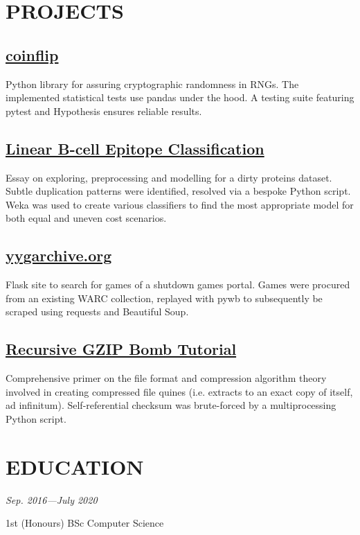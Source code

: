 \documentclass[11pt]{article}
\newcommand{\fakesubsection}[1]{\large{\subsectionfont{#1}}}
\begin{document}
\section*{PROJECTS}

\subsection*{\href{https://github.com/honno/coinflip/}{coinflip}}

Python library for assuring cryptographic randomness in RNGs. The implemented statistical tests use pandas under the hood. A testing suite featuring pytest and Hypothesis ensures reliable results.

\subsection*{\href{https://github.com/honno/epitope-classification}{Linear B-cell Epitope Classification}}

Essay on exploring, preprocessing and modelling for a dirty proteins dataset. Subtle duplication patterns  were identified, resolved via a bespoke Python script. Weka was used to create various classifiers to find the most appropriate model for both equal and uneven cost scenarios.

%

\subsection*{\href{https://www.yygarchive.org/}{yygarchive.org}}

Flask site to search for games of a shutdown games portal. Games were procured from an existing WARC collection, replayed with pywb to subsequently be scraped using requests and Beautiful Soup.

\subsection*{\href{https://matthewbarber.io/gzip-quine/}{Recursive GZIP Bomb Tutorial}}

Comprehensive primer on the file format and compression algorithm theory involved in creating compressed file quines (i.e. extracts to an exact copy of itself, ad infinitum). Self-referential checksum was brute-forced by a multiprocessing Python script.

\section*{EDUCATION}

\fakesubsection{Aston University} \hfill {\small\textit{Sep. 2016—July 2020}}

1st (Honours) BSc Computer Science
\end{document}
